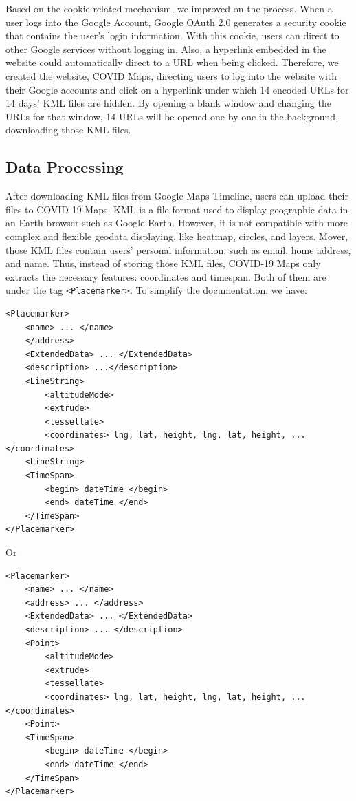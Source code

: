 \documentclass{ucsdreport}
\begin{document}
Based on the cookie-related mechanism, we improved on the process. When a user 
logs into the Google Account, Google OAuth 2.0 generates a security cookie that 
contains the user's login information. With this cookie, users can direct to 
other Google services without logging in. Also, a hyperlink embedded in the 
website could automatically direct to a URL when being clicked. Therefore, we 
created the website, COVID Maps, directing users to log into the website with 
their Google accounts and click on a hyperlink under which 14 encoded URLs for
14 days' KML files are hidden. By opening a blank window and changing the URLs 
for that window, 14 URLs will be opened one by one in the background, 
downloading those KML files. 

\subsection{Data Processing}

After downloading KML files from Google Maps Timeline, users can upload their 
files to COVID-19 Maps. KML is a file format used to display geographic data 
in an Earth browser such as Google Earth. However, it is not compatible with 
more complex and flexible geodata displaying, like heatmap, circles, and layers.
Mover, those KML files contain users’ personal information, such as email, 
home address, and name. Thus, instead of storing those KML files, COVID-19 Maps
only extracts the necessary features: coordinates and timespan. Both of them are 
under the tag \texttt{<Placemarker>}. To simplify the documentation, we have:

\begin{verbatim}
<Placemarker>
    <name> ... </name>
    </address>
    <ExtendedData> ... </ExtendedData>
    <description> ...</description> 
    <LineString>
        <altitudeMode>
        <extrude>
        <tessellate>
        <coordinates> lng, lat, height, lng, lat, height, ...</coordinates>
    <LineString>
    <TimeSpan>
        <begin> dateTime </begin>
        <end> dateTime </end>
    </TimeSpan>
</Placemarker> 
\end{verbatim}

Or 

\begin{verbatim}
<Placemarker>
    <name> ... </name>
    <address> ... </address> 
    <ExtendedData> ... </ExtendedData>
    <description> ... </description> 
    <Point>
        <altitudeMode>
        <extrude>
        <tessellate>
        <coordinates> lng, lat, height, lng, lat, height, ... </coordinates>
    <Point>
    <TimeSpan>
        <begin> dateTime </begin>
        <end> dateTime </end>
    </TimeSpan>
</Placemarker> 
\end{verbatim}
\end{document}
